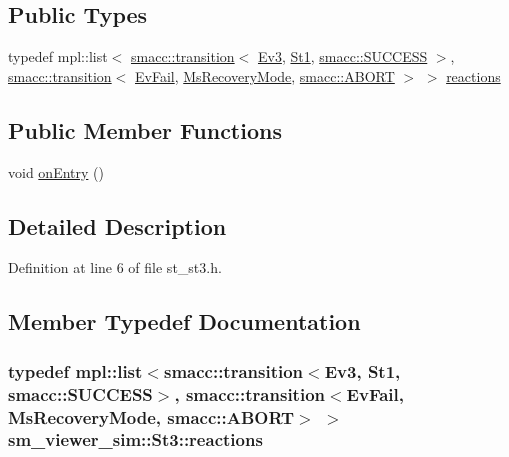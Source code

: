 \subsection*{Public Types}
\begin{DoxyCompactItemize}
\item 
typedef mpl\+::list$<$ \hyperlink{classsmacc_1_1transition}{smacc\+::transition}$<$ \hyperlink{structsm__viewer__sim_1_1Ev3}{Ev3}, \hyperlink{structsm__viewer__sim_1_1St1}{St1}, \hyperlink{structsmacc_1_1SUCCESS}{smacc\+::\+S\+U\+C\+C\+E\+SS} $>$, \hyperlink{classsmacc_1_1transition}{smacc\+::transition}$<$ \hyperlink{structsm__viewer__sim_1_1EvFail}{Ev\+Fail}, \hyperlink{structsm__viewer__sim_1_1MsRecoveryMode}{Ms\+Recovery\+Mode}, \hyperlink{structsmacc_1_1ABORT}{smacc\+::\+A\+B\+O\+RT} $>$ $>$ \hyperlink{structsm__viewer__sim_1_1St3_a534a612fdf3b259a359803c2f6947edb}{reactions}
\end{DoxyCompactItemize}
\subsection*{Public Member Functions}
\begin{DoxyCompactItemize}
\item 
void \hyperlink{structsm__viewer__sim_1_1St3_a283ea2f506562090b95a40183c6b4f41}{on\+Entry} ()
\end{DoxyCompactItemize}


\subsection{Detailed Description}


Definition at line 6 of file st\+\_\+st3.\+h.



\subsection{Member Typedef Documentation}
\subsubsection[{\texorpdfstring{reactions}{reactions}}]{\setlength{\rightskip}{0pt plus 5cm}typedef mpl\+::list$<${\bf smacc\+::transition}$<${\bf Ev3}, {\bf St1}, {\bf smacc\+::\+S\+U\+C\+C\+E\+SS}$>$, {\bf smacc\+::transition}$<${\bf Ev\+Fail}, {\bf Ms\+Recovery\+Mode}, {\bf smacc\+::\+A\+B\+O\+RT}$>$ $>$ {\bf sm\+\_\+viewer\+\_\+sim\+::\+St3\+::reactions}}\hypertarget{structsm__viewer__sim_1_1St3_a534a612fdf3b259a359803c2f6947edb}{}\label{structsm__viewer__sim_1_1St3_a534a612fdf3b259a359803c2f6947edb}


